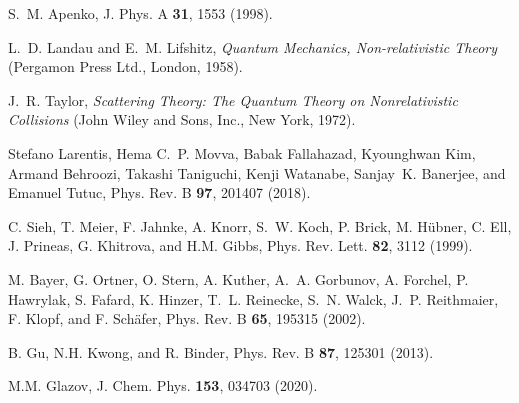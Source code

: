\documentclass[aps,prb,superscriptaddress,letterpaper,amsmath,amssymb,twocolumn,preprintnumbers]{revtex4}
\begin{document}
\begin{thebibliography}{10}
S.~M. Apenko, J. Phys. A {\bf 31},  1553  (1998).

L.~D. Landau and E.~M. Lifshitz, {\em Quantum Mechanics, Non-relativistic
  Theory} (Pergamon Press Ltd., London, 1958).

J.~R. Taylor, {\em Scattering Theory: The Quantum Theory on Nonrelativistic
  Collisions} (John Wiley and Sons, Inc., New York, 1972).

Stefano Larentis, Hema C.~P. Movva, Babak Fallahazad, Kyounghwan Kim, Armand
  Behroozi, Takashi Taniguchi, Kenji Watanabe, Sanjay~K. Banerjee, and Emanuel
  Tutuc, Phys. Rev. B {\bf 97},  201407  (2018).

C. Sieh, T. Meier, F. Jahnke, A. Knorr, S.~W. Koch, P. Brick, M. H{\"{u}}bner,
  C. Ell, J. Prineas, G. Khitrova, and H.M. Gibbs, Phys. Rev. Lett. {\bf 82},
  3112  (1999).

M. Bayer, G. Ortner, O. Stern, A. Kuther, A.~A. Gorbunov, A. Forchel, P.
  Hawrylak, S. Fafard, K. Hinzer, T.~L. Reinecke, S.~N. Walck, J.~P.
  Reithmaier, F. Klopf, and F. Sch\"afer, Phys. Rev. B {\bf 65},  195315
  (2002).

B. Gu, N.H. Kwong, and R. Binder, Phys. Rev. B {\bf 87},  125301   (2013).

M.M. Glazov, J. Chem. Phys. {\bf 153},  034703  (2020).

\end{thebibliography}
\end{document}
